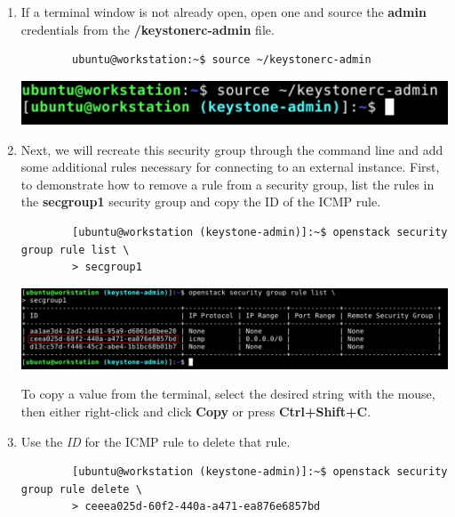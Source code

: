 \documentclass[letterpaper, 12pt]{article}
\begin{document}
\begin{enumerate}
    \item If a terminal window is not already open, open one and source the \textbf{admin} credentials from the
    \textbf{\texttildemid/keystonerc-admin} file.
    \begin{lstlisting}
        ubuntu@workstation:~$ source ~/keystonerc-admin
    \end{lstlisting}

    \begin{center}
        \includegraphics[width=\linewidth]{images/part5/step7.png}
    \end{center}

    \item Next, we will recreate this security group through the command line and add some additional rules necessary for connecting to an external instance.
    First, to demonstrate how to remove a rule from a security group, list the rules in the \textbf{secgroup1} security group and copy the ID of the ICMP rule.
    \begin{lstlisting}
        [ubuntu@workstation (keystone-admin)]:~$ openstack security group rule list \
        > secgroup1
    \end{lstlisting}

    \begin{center}
        \includegraphics[width=\linewidth]{images/part5/step8.png}
    \end{center}

    \begin{tipbox}
        To copy a value from the terminal, select the desired string with the mouse, then either right-click and click \textbf{Copy} or press \textbf{Ctrl+Shift+C}.
    \end{tipbox}

    \item Use the \textit{ID} for the ICMP rule to delete that rule.
    \begin{lstlisting}
        [ubuntu@workstation (keystone-admin)]:~$ openstack security group rule delete \
        > ceeea025d-60f2-440a-a471-ea876e6857bd
    \end{lstlisting}


\end{enumerate}
\end{document}
